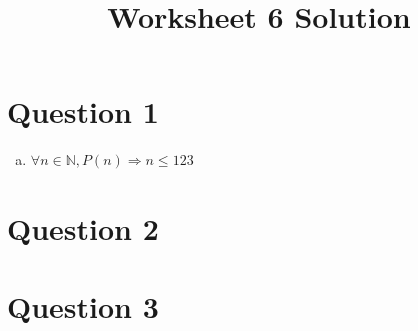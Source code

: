 \documentclass[12pt]{article}
\begin{document}
\title{Worksheet 6 Solution}
\maketitle

\section*{Question 1}
\begin{enumerate}[a.]
    \item

    $\forall n \in \mathbb{N}, P(n) \Rightarrow n \leq 123$

\end{enumerate}

\section*{Question 2}

\section*{Question 3}
\end{document}
